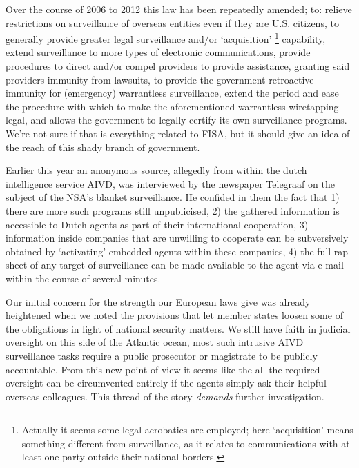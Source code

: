 \documentclass[11pt, a4paper]{article}
\begin{document}
Over the course of 2006 to 2012 this law has been repeatedly amended; to: relieve restrictions on surveillance of overseas entities even if they are U.S. citizens, to generally provide greater legal surveillance and/or `acquisition' \footnote{
Actually it seems some legal acrobatics are employed; here `acquisition' means something different from surveillance, as it relates to communications with at least one party outside their national borders.
}
capability, extend surveillance to more types of electronic communications, provide procedures to direct and/or compel providers to provide assistance, granting said providers immunity from lawsuits, to provide the government retroactive immunity for (emergency) warrantless surveillance, extend the period and ease the procedure with which to make the aforementioned warrantless wiretapping legal, and allows the government to legally certify its own surveillance programs.
We're not sure if that is everything related to FISA, but it should give an idea of the reach of this shady branch of government.

Earlier this year an anonymous source, allegedly from within the dutch intelligence service AIVD, was interviewed by the newspaper Telegraaf on the subject of the NSA's blanket surveillance. \cite{telegraaf}
He confided in them the fact that 1) there are more such programs still unpublicised, 2) the gathered information is accessible to Dutch agents as part of their international cooperation, 3) information inside companies that are unwilling to cooperate can be subversively obtained by `activating' embedded agents within these companies, 4) the full rap sheet of any target of surveillance can be made available to the agent via e-mail within the course of several minutes.

Our initial concern for the strength our European laws give was already heightened when we noted the provisions that let member states loosen some of the obligations in light of national security matters.
We still have faith in judicial oversight on this side of the Atlantic ocean, most such intrusive AIVD surveillance tasks require a public prosecutor or magistrate to be publicly accountable.
From this new point of view it seems like the all the required oversight can be circumvented entirely if the agents simply ask their helpful overseas colleagues.
This thread of the story \textit{demands} further investigation.
\end{document}
